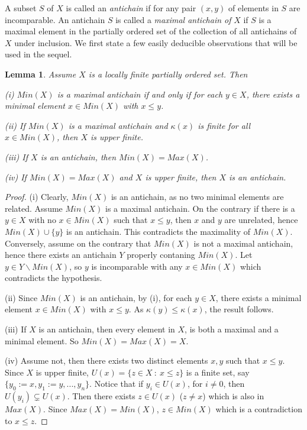 \documentclass[12pt]{article}
\newtheorem{lemma}[theorem]{Lemma}
\begin{document}


A subset $S$ of $X$ is called an \textit{antichain} if for any pair $(x,y)$
of elements in $S$ are incomparable. An antichain $S$ is called a \textit{%
maximal antichain of }$X$ if $S$ is a maximal element in the partially
ordered set of the collection of all antichains of $X$ under inclusion. We
first state a few easily deducible observations that will be used in the
sequel.


\begin{lemma}
\label{propPoset} Assume $X$ is a locally finite partially ordered set. Then

\textrm{(i)} %
$Min(X)$ is a maximal antichain if and only if for each $y\in X$, there
exists a minimal element $x\in Min(X)$ with $x \leq y$.

\textrm{(ii)} %
If $Min(X)$ is a maximal antichain and $\kappa(x)$ is finite for all $x \in
Min(X)$, then $X$ is upper finite.

\textrm{(iii)} %
If $X$ is an antichain, then $Min(X)=Max(X)$.

\textrm{(iv)} %
If $Min(X)=Max(X)$ and $X$ is upper finite, then $X$ is an antichain.
\end{lemma}

\begin{proof}
\textrm{(i)} Clearly, $Min(X)$ is an antichain, as no two minimal elements
are related. Assume $Min(X)$ is a maximal antichain. On the contrary if
there is a $y\in X$ with no $x\in Min(X)$ such that $x \leq y$, then $x$ and 
$y$ are unrelated, hence $Min(X) \cup \{ y\}$ is an antichain. This
contradicts the maximality of $Min(X)$. 
Conversely, assume on the contrary that $Min(X)$ is not a maximal antichain,
hence there exists an antichain $Y$ properly contaning $Min(X)$. Let $y \in
Y \backslash Min(X)$, so $y$ is incomparable with any $x \in Min(X)$ which
contradicts the hypothesis.

\textrm{(ii)} Since $Min(X)$ is an antichain, by \textrm{(i)}, for each $%
y\in X $, there exists a minimal element $x\in Min(X)$ with $x \leq y$. As $%
\kappa(y) \leq \kappa(x)$, the result follows.

\textrm{(iii)} If $X$ is an antichain, then every element in $X$, is both a
maximal and a minimal element. So $Min(X)=Max(X)=X$. 

\textrm{(iv)} Assume not, then there exists two distinct elements $x,y$ such
that $x \leq y$. Since $X$ is upper finite, $U(x) = \{z \in X \ : \ x \leq z
\}$ is a finite set, say $\{y_0:=x,y_1:=y,..., y_n \}$. Notice that if $y_i
\in U(x)$, for $i \neq 0$, then $U(y_i) \subsetneq U(x)$. Then there exists $%
z \in U(x)$ ($z \neq x$) which is also in $Max(X)$. Since $Max(X)=Min(X)$, $%
z\in Min(X)$ which is a contradiction to $x \leq z$.
\end{proof}
\end{document}
